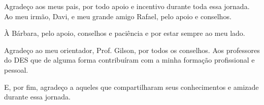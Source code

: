 Agradeço aos meus pais, por todo apoio e incentivo durante toda essa jornada. Ao meu irmão, Davi, e meu grande amigo Rafael, pelo apoio e conselhos.

À Bárbara, pelo apoio, conselhos e paciência e por estar sempre ao meu lado.

Agradeço ao meu orientador, Prof. Gilson, por todos os conselhos. Aos professores do DES que de alguma forma contribuíram com a minha formação profissional e pessoal.

E, por fim, agradeço a aqueles que compartilharam seus conhecimentos e amizade durante essa jornada.